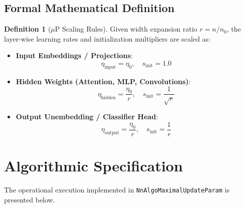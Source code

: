 \documentclass[11pt,a4paper]{article}
\theoremstyle{definition}
\newtheorem{definition}{Definition}[section]
\begin{document}
\subsection{Formal Mathematical Definition}
\begin{definition}[$\mu\text{P}$ Scaling Rules]
Given width expansion ratio $r = n / n_0$, the layer-wise learning rates and initialization multipliers are scaled as:
\begin{itemize}
    \item \textbf{Input Embeddings / Projections}:
    \begin{equation}
    \eta_{\text{input}} = \eta_0, \quad s_{\text{init}} = 1.0 \label{eq:mup_input}
    \end{equation}
    \item \textbf{Hidden Weights (Attention, MLP, Convolutions)}:
    \begin{equation}
    \eta_{\text{hidden}} = \frac{\eta_0}{r}, \quad s_{\text{init}} = \frac{1}{\sqrt{r}} \label{eq:mup_hidden}
    \end{equation}
    \item \textbf{Output Unembedding / Classifier Head}:
    \begin{equation}
    \eta_{\text{output}} = \frac{\eta_0}{r}, \quad s_{\text{init}} = \frac{1}{r} \label{eq:mup_output}
    \end{equation}
\end{itemize}
\end{definition}

\section{Algorithmic Specification}

The operational execution implemented in \texttt{NnAlgoMaximalUpdateParam} is presented below.
\end{document}
